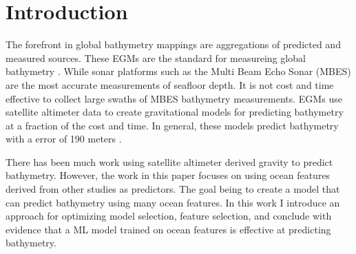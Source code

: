 
\section{Introduction}
\setlength{\parindent}{10ex}
The forefront in global bathymetry mappings are aggregations of predicted and measured sources. 
These \ac{EGM}s are the standard for measureing global bathymetry \cite{becker2009global}\cite{smith1994bathymetric}\cite{smith1997global}\cite{smith2010planning}.
While sonar platforms such as the Multi Beam Echo Sonar (MBES) \cite{farr1980multibeam} are the most accurate measurements of seafloor depth.
It is not cost and time effective to collect large swaths of \ac{MBES} bathymetry measurements.
\ac{EGM}s use satellite altimeter data to create gravitational models for predicting bathymetry at a fraction of the cost and time.
In general, these models predict bathymetry with a error of 190 meters \cite{jena2012prediction}.

\par
There has been much work using satellite altimeter derived gravity to predict bathymetry.
However, the work in this paper focuses on using ocean features derived from other studies as predictors.
The goal being to create a model that can predict bathymetry using many ocean features.
In this work I introduce an approach for optimizing model selection, feature selection, and conclude with evidence that a \ac{ML} model trained on ocean features is effective at predicting bathymetry.